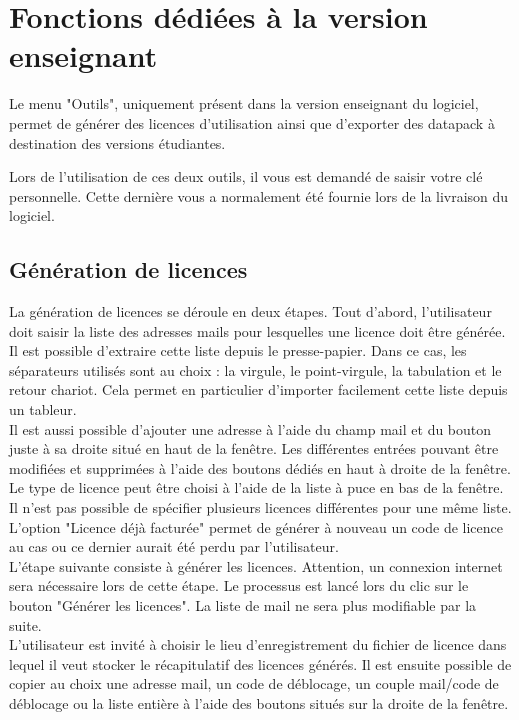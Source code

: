 
\chapter{Fonctions dédiées à la version enseignant}
Le menu "Outils", uniquement présent dans la version enseignant du logiciel, permet de générer des licences d'utilisation ainsi que d'exporter des datapack à destination des versions étudiantes.

Lors de l'utilisation de ces deux outils, il vous est demandé de saisir votre clé personnelle. Cette dernière vous a normalement été fournie lors de la livraison du logiciel.\\

\section{Génération de licences}
La génération de licences se déroule en deux étapes. Tout d'abord, l'utilisateur doit saisir la liste des adresses mails pour lesquelles une licence doit être générée. Il est possible d'extraire cette liste depuis le presse-papier. Dans ce cas, les séparateurs utilisés sont au choix : la virgule, le point-virgule, la tabulation et le retour chariot. Cela permet en particulier d'importer facilement cette liste depuis un tableur.\\
Il est aussi possible d'ajouter une adresse à l'aide du champ mail et du bouton juste à sa droite situé en haut de la fenêtre. Les différentes entrées pouvant être modifiées et supprimées à l'aide des boutons dédiés en haut à droite de la fenêtre.\\
Le type de licence peut être choisi à l'aide de la liste à puce en bas de la fenêtre. Il n'est pas possible de spécifier plusieurs licences différentes pour une même liste. L'option "Licence déjà facturée" permet de générer à nouveau un code de licence au cas ou ce dernier aurait été perdu par l'utilisateur.\\

L'étape suivante consiste à générer les licences. Attention, un connexion internet sera nécessaire lors de cette étape. Le processus est lancé lors du clic sur le bouton "Générer les licences". La liste de mail ne sera plus modifiable par la suite.\\

L'utilisateur est invité à choisir le lieu d'enregistrement du fichier de licence dans lequel il veut stocker le récapitulatif des licences générés. Il est ensuite possible de copier au choix une adresse mail, un code de déblocage, un couple mail/code de déblocage ou la liste entière à l'aide des boutons situés sur la droite de la fenêtre.\\

